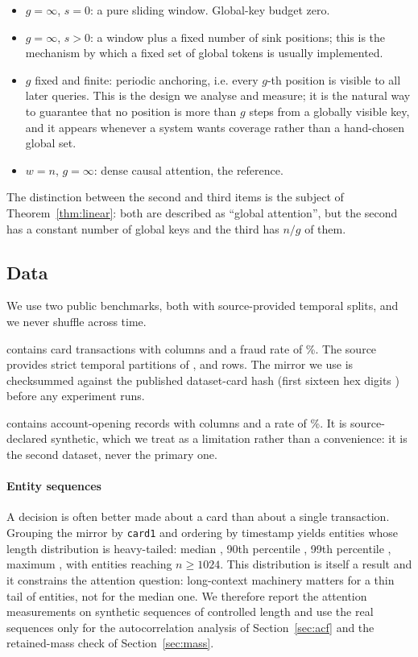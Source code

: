 \begin{itemize}
\item $g=\infty$, $s=0$: a pure sliding window. Global-key budget zero.
\item $g=\infty$, $s>0$: a window plus a fixed number of sink positions; this
is the mechanism by which a fixed set of global tokens is usually implemented.
\item $g$ fixed and finite: periodic anchoring, i.e. every $g$-th position is
visible to all later queries. This is the design we analyse and measure; it is
the natural way to guarantee that no position is more than $g$ steps from a
globally visible key, and it appears whenever a system wants coverage rather
than a hand-chosen global set.
\item $w=n$, $g=\infty$: dense causal attention, the reference.
\end{itemize}

The distinction between the second and third items is the subject of
Theorem~\ref{thm:linear}: both are described as ``global attention'', but the
second has a constant number of global keys and the third has $n/g$ of them.

\subsection{Data}

We use two public benchmarks, both with source-provided temporal splits, and we
never shuffle across time.

\DatasetIeee{} \cite{ieeecis2019} contains \IeeeRows{} card transactions with
\IeeeCols{} columns and a fraud rate of \IeeeFraudPct\%. The source provides
strict temporal partitions of \TrainRows{}, \ValRows{} and \TestRows{} rows. The
mirror we use is checksummed against the published dataset-card hash (first
sixteen hex digits \IeeeSha) before any experiment runs.

\DatasetBaf{} \cite{jesus2022turning} contains \BafRows{} account-opening
records with \BafCols{} columns and a rate of \BafFraudPct\%. It is
source-declared synthetic, which we treat as a limitation rather than a
convenience: it is the second dataset, never the primary one.

\paragraph{Entity sequences} A decision is often better made about a card than
about a single transaction. Grouping the mirror by \texttt{card1} and ordering by
timestamp yields \NEtities{} entities whose length distribution is heavy-tailed:
median \MedianLen, 90th percentile \PninetyLen, 99th percentile
\PninetyNineLen, maximum \MaxLen, with \EntGteThousand{} entities reaching
$n\ge 1024$. This distribution is itself a result and it constrains the
attention question: long-context machinery matters for a thin tail of entities,
not for the median one. We therefore report the attention measurements on
synthetic sequences of controlled length and use the real sequences only for the
autocorrelation analysis of Section~\ref{sec:acf} and the retained-mass check of
Section~\ref{sec:mass}.

